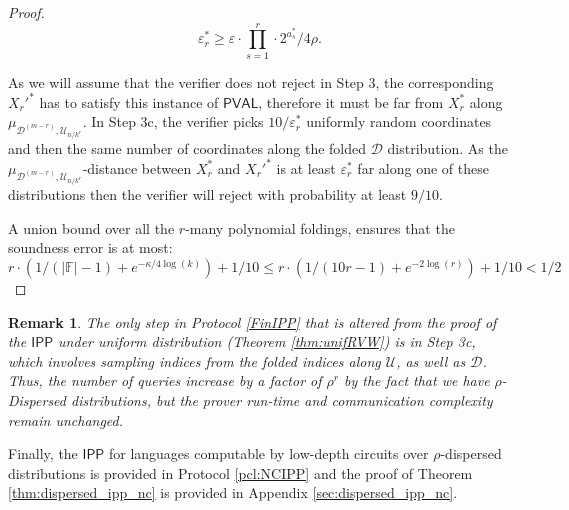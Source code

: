 \documentclass[10pt,a4paper]{article}
\newtheorem{remark}{Remark}
\newcommand{\PVAL}{\mathsf{PVAL}}
\newcommand{\IPP}{\mathsf{IPP}}
\newcommand{\sU}{\mathcal{U}}
\newcommand{\sD}{\mathcal{D}}
\begin{document}
\begin{proof}
\begin{equation*}
    \varepsilon_{r}^{\ast} \geq \varepsilon\cdot \prod_{s=1}^{r} \cdot 2^{a_{s}^{\ast}}/4\rho.
\end{equation*}

As we will assume that the verifier does not reject in Step 3, the corresponding $X_{r}'^{\ast}$ has to satisfy this instance of $\PVAL$, therefore it must be far from $X_{r}^{\ast}$ along $\mu_{\mathcal{D}^{(m-r)},\mathcal{U}_{n/k^{r}}}$. In Step 3c, the verifier picks $10/\varepsilon_{r}^{\ast}$ uniformly random coordinates and then the same number of coordinates along the folded $\mathcal{D}$ distribution. As the $\mu_{\mathcal{D}^{(m-r)},\mathcal{U}_{n/k^{r}}}$-distance between $X_{r}^{\ast}$ and $X_{r}'^{\ast}$ is at least $\varepsilon^*_r$ far along one of these distributions then the verifier will reject with probability at least $9/10$.

A union bound over all the $r$-many polynomial foldings, ensures that the soundness error is at most:
\begin{equation*}
    r\cdot(1/(\vert \mathbb{F}\vert -1)+e^{-\kappa/4\log (k)})+1/10 \leq r\cdot(1/(10r-1)+e^{-2\log (r)})+1/10 <1/2
\end{equation*}
\end{proof}

\begin{remark}
The only step in Protocol \ref{FinIPP} that is altered from the proof of the $\IPP$ under uniform distribution (Theorem \ref{thm:unifRVW}) is in Step 3c, which involves sampling indices from the folded indices along $\sU$, as well as $\sD$. Thus, the number of queries increase by a factor of $\rho^{r}$ by the fact that we have $\rho$-Dispersed distributions, but the prover run-time and communication complexity remain unchanged.
\end{remark}

\noindent Finally, the $\IPP$ for languages computable by low-depth circuits over $\rho$-dispersed distributions is provided in Protocol \ref{pcl:NCIPP} and the proof of Theorem \ref{thm:dispersed_ipp_nc} is provided in Appendix \ref{sec:dispersed_ipp_nc}.
\end{document}
